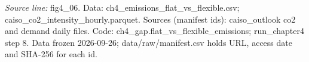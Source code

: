 {\scriptsize\textit{Source line:} fig4\_\allowbreak{}06. Data: ch4\_\allowbreak{}emissions\_\allowbreak{}flat\_\allowbreak{}vs\_\allowbreak{}flexible.csv; caiso\_\allowbreak{}co2\_\allowbreak{}intensity\_\allowbreak{}hourly.parquet. Sources (manifest ids): caiso\_\allowbreak{}outlook co2 and demand daily files. Code: ch4\_\allowbreak{}gap.flat\_\allowbreak{}vs\_\allowbreak{}flexible\_\allowbreak{}emissions; run\_\allowbreak{}chapter4 step 8. Data frozen 2026-09-26; data/raw/manifest.csv holds URL, access date and SHA-256 for each id.}